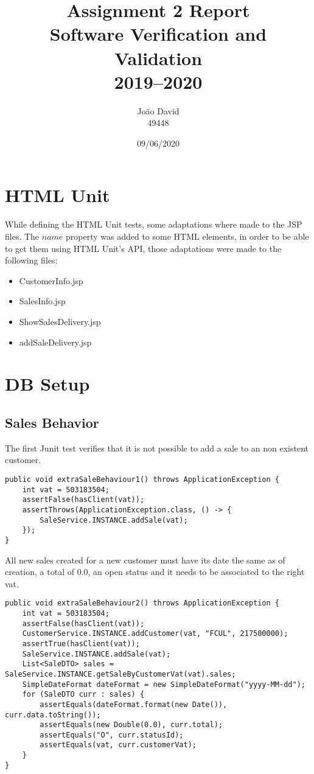 \documentclass[12pt]{article}
\title{Assignment 2 Report \\
  \Large Software Verification and Validation \\ 2019--2020
}
\author{
  João David\\49448
}
\date{09/06/2020}
\begin{document}
\maketitle

\section{HTML Unit}
While defining the HTML Unit tests, some adaptations where made to the JSP files. The $name$ property was added to some HTML elements, in order to be able to get them using HTML Unit's API, those adaptations were made to the following files:

\begin{itemize}
   \item  CustomerInfo.jsp
   
   \item  SalesInfo.jsp
   
   \item  ShowSalesDelivery.jsp
   
   \item  addSaleDelivery.jsp  
\end{itemize}

\newpage

\section{DB Setup}
\subsection{Sales Behavior}
The first Junit test verifies that it is not possible to add a sale to an non existent customer. 
\begin{lstlisting}
public void extraSaleBehaviour1() throws ApplicationException {
	int vat = 503183504;
	assertFalse(hasClient(vat));
	assertThrows(ApplicationException.class, () -> {
		SaleService.INSTANCE.addSale(vat);
	});	
}	
\end{lstlisting}

All new sales created for a new customer must have its date the same as of creation, a total of 0.0, an open status and it needs to be associated to the right vat.
\begin{lstlisting}
public void extraSaleBehaviour2() throws ApplicationException {
	int vat = 503183504;
	assertFalse(hasClient(vat));
	CustomerService.INSTANCE.addCustomer(vat, "FCUL", 217500000);
	assertTrue(hasClient(vat));
	SaleService.INSTANCE.addSale(vat);
	List<SaleDTO> sales = SaleService.INSTANCE.getSaleByCustomerVat(vat).sales;
	SimpleDateFormat dateFormat = new SimpleDateFormat("yyyy-MM-dd");
	for (SaleDTO curr : sales) {
		assertEquals(dateFormat.format(new Date()), curr.data.toString());
		assertEquals(new Double(0.0), curr.total);
		assertEquals("O", curr.statusId);
		assertEquals(vat, curr.customerVat);
	}		
}
\end{lstlisting}
\end{document}
